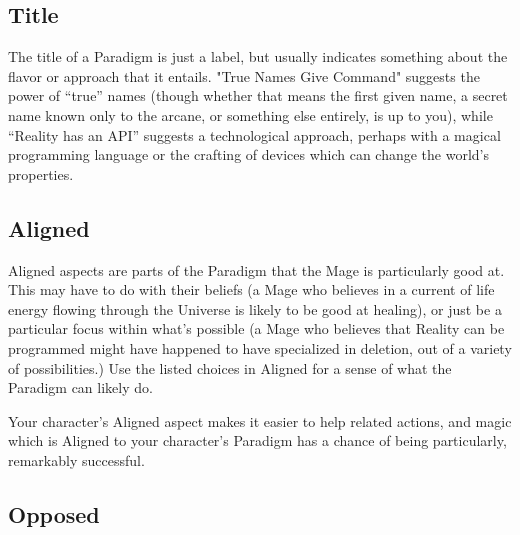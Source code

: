 \documentclass[
  oneside,
  statementpaper,
  9pt]{memoir}
\begin{document}
\hypertarget{title}{%
\subsection{Title}\label{title}}

\begin{Player}

The title of a Paradigm is just a label, but usually indicates something about the flavor or approach that it entails. "True Names Give Command" suggests the power of “true” names (though whether that means the first given name, a secret name known only to the arcane, or something else entirely, is up to you), while “Reality has an API” suggests a technological approach, perhaps with a magical programming language or the crafting of devices which can change the world’s properties.

\end{Player}

\hypertarget{aligned}{%
\subsection{Aligned}\label{aligned}}

\begin{Player}

Aligned aspects are parts of the Paradigm that the Mage is particularly good at. This may have to do with their beliefs (a Mage who believes in a current of life energy flowing through the Universe is likely to be good at healing), or just be a particular focus within what’s possible (a Mage who believes that Reality can be programmed might have happened to have specialized in deletion, out of a variety of possibilities.) Use the listed choices in Aligned for a sense of what the Paradigm can likely do.

Your character's Aligned aspect makes it easier to help related actions, and magic which is Aligned to your character's Paradigm has a chance of being particularly, remarkably successful.

\end{Player}

\hypertarget{opposed}{%
\subsection{Opposed}\label{opposed}}
\end{document}
